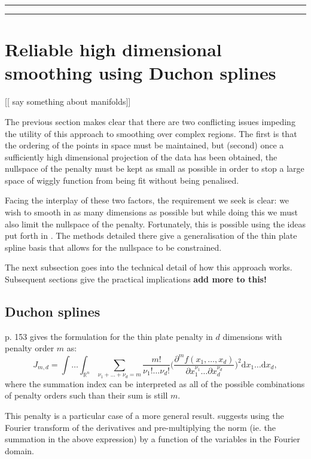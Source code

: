 {\rule{6in}{1pt}

\rule{6in}{1pt}

\section{Reliable high dimensional smoothing using Duchon splines}

[[ say something about manifolds]]

The previous section makes clear that there are two conflicting issues impeding the utility of this approach to smoothing over complex regions. The first is that the ordering of the points in space must be maintained, but (second) once a sufficiently high dimensional projection of the data has been obtained, the nullspace of the penalty must be kept as small as possible in order to stop a large space of wiggly function from being fit without being penalised.

Facing the interplay of these two factors, the requirement we seek is clear: we wish to smooth in as many dimensions as possible but while doing this we must also limit the nullspace of the penalty. Fortunately, this is possible using the ideas put forth in \cite{duchon77}. The methods detailed there give a generalisation of the thin plate spline basis that allows for the nullspace to be constrained.

The next subsection goes into the technical detail of how this approach works. Subsequent sections give the practical implications \textbf{add more to this!}

\subsection{Duchon splines}

\cite{simonbook} p. 153 gives the formulation for the thin plate penalty in $d$ dimensions with penalty order $m$ as:
\begin{equation}
J_{m,d} = \int \ldots \int_{\mathbb{R}^n} \sum_{\nu_1 + \dots + \nu_d=m} \frac{m!}{\nu_1! \dots \nu_d!}\Big( \frac{\partial^m f(x_1,\dots,x_d)}{\partial x_1^{\nu_1} \ldots  \partial x_d^{\nu_d}} \Big)^2 \text{d} x_1 \ldots  \text{d} x_d,
\end{equation}
where the summation index can be interpreted as all of the possible combinations of penalty orders such than their sum is still $m$.

This penalty is a particular case of a more general result. \cite{duchon77} suggests using the Fourier transform of the derivatives and pre-multiplying the norm (ie. the summation in the above expression) by a function of the variables in the Fourier domain.

}
